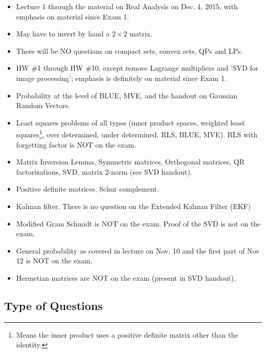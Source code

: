 \documentclass[letterpaper]{article}
\begin{document}
\begin{itemize}
\item Lecture 1 through the material on Real Analysis on Dec. 4, 2015, with emphasis on material since Exam 1.
\item May have to invert by hand a $2 \times 2$ matrix.
\item There will be NO questions on compact sets, convex sets, QPs and LPs.
\item HW \#1 through HW \#10, except remove Lagrange multipliers and 'SVD for image processing'; emphasis is definitely on material since Exam 1.
\item Probability at the level of BLUE, MVE, and the handout on Gaussian Random Vectors.
\item Least squares problems of all types (inner product spaces, weighted least squares\footnote{Means the inner product uses a positive definite matrix other than the identity.}, over determined, under determined, RLS, BLUE, MVE). RLS with forgetting factor is NOT on the exam.
\item Matrix Inversion Lemma, Symmetric matrices, Orthogonal matrices,  QR factorizations, SVD, matrix 2-norm (see SVD handout).
\item Positive definite matrices, Schur complement.
\item Kalman filter. There is no question on the Extended Kalman Filter (EKF)
\item Modified Gram Schmidt is NOT on the exam. Proof of the SVD is not on the exam.
\item General probability as covered in lecture on Nov. 10 and the first part of Nov 12 is NOT on the exam.
\item Hermetian matrices are NOT on the exam (present in SVD handout).
\end{itemize}

\subsection*{Type of Questions}
\end{document}
